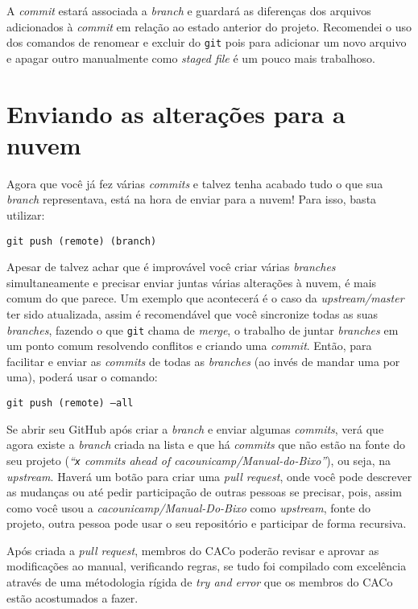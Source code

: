 \documentclass[a4paper,oneside,10pt]{memoir}
\begin{document}
A \emph{commit} estará associada a \emph{branch} e guardará as diferenças dos
arquivos adicionados à \emph{commit} em relação ao estado anterior do projeto.
Recomendei o uso dos comandos de renomear e excluir do \texttt{git} pois para
adicionar um novo arquivo e apagar outro manualmente como \emph{staged file} é
um pouco mais trabalhoso.

\section{Enviando as alterações para a nuvem}

Agora que você já fez várias \emph{commits} e talvez tenha acabado tudo o que
sua \emph{branch} representava, está na hora de enviar para a nuvem! Para isso,
basta utilizar:

\begin{center}
\texttt{git push (remote) (branch)}
\end{center}

Apesar de talvez achar que é improvável você criar várias \emph{branches}
simultaneamente e precisar enviar juntas várias alterações à nuvem, é mais
comum do que parece. Um exemplo que acontecerá é o caso da
\emph{upstream/master} ter sido atualizada, assim é recomendável que você
sincronize todas as suas \emph{branches}, fazendo o que \texttt{git} chama de
\emph{merge}, o trabalho de juntar \emph{branches} em um ponto comum resolvendo
conflitos e criando uma \emph{commit}. Então, para facilitar e enviar as
\emph{commits} de todas as \emph{branches} (ao invés de mandar uma por uma),
poderá usar o comando:

\begin{center}
\texttt{git push (remote) --all}
\end{center}

Se abrir seu GitHub após criar a \emph{branch} e enviar algumas \emph{commits},
verá que agora existe a \emph{branch} criada na lista e que há \emph{commits}
que não estão na fonte do seu projeto (\emph{``\texttt{x} commits ahead of
cacounicamp/Manual-do-Bixo''}), ou seja, na \emph{upstream}. Haverá um botão
para criar uma \emph{pull request}, onde você pode descrever as mudanças ou até
pedir participação de outras pessoas se precisar, pois, assim como você usou a
\emph{cacounicamp/Ma\-nual-Do-Bixo} como \emph{upstream}, fonte do projeto,
outra pessoa pode usar o seu repositório e participar de forma recursiva.

Após criada a \emph{pull request}, membros do CACo poderão revisar e aprovar as
modificações ao manual, verificando regras, se tudo foi compilado com
excelência através de uma métodologia rígida de \emph{try and error} que os
membros do CACo estão acostumados a fazer.
\end{document}

